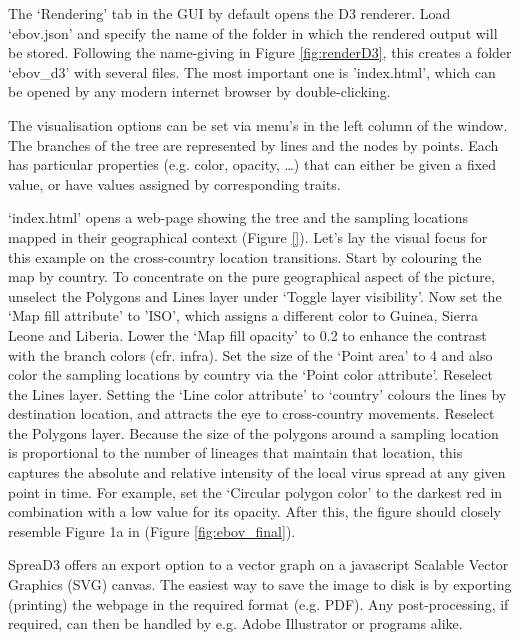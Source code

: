 \documentclass[english]{paper}
\begin{document}
The `Rendering' tab in the GUI by default opens the D3 renderer.
Load `ebov.json' and specify the name of the folder in which the rendered output will be stored. %
Following the name-giving in Figure \ref{fig:renderD3}, this creates a folder `ebov\_d3' with several files.
The most important one is 'index.html', which can be opened by any modern internet browser by double-clicking. 
\par
The visualisation options can be set via menu's in the left column of the window.
The branches of the tree are represented by lines and the nodes by points. %
Each has particular properties (e.g. color, opacity, \dots) that can either be given a fixed value, or have values assigned by corresponding traits.
\par
`index.html' opens a web-page showing the tree and the sampling locations mapped in their geographical context (Figure \ref{}). 
Let's lay the visual focus for this example on the cross-country location transitions.
Start by colouring the map by country. 
To concentrate on the pure geographical aspect of the picture, unselect the Polygons and Lines layer under `Toggle layer visibility'.
Now set the `Map fill attribute' to 'ISO', which assigns a different color to Guinea, Sierra Leone and Liberia.
Lower the `Map fill opacity' to 0.2 to enhance the contrast with the branch colors (cfr. infra).
Set the size of the `Point area' to 4 and also color the sampling locations by country via the `Point color attribute'.
Reselect the Lines layer.
Setting the `Line color attribute' to `country' colours the lines by destination location, and attracts the eye to cross-country movements.
Reselect the Polygons layer.
Because the size of the polygons around a sampling location is proportional to the number of lineages that maintain that location, this captures the absolute and relative intensity of the local virus spread at any given point in time.
For example, set the `Circular polygon color'  to the darkest red in combination with a low value for its opacity. 
After this, the figure should closely resemble Figure 1a in \cite{Bielejec:2016aa} (Figure \ref{fig:ebov_final}).
\par
SpreaD3 offers an export option to a vector graph on a javascript Scalable Vector Graphics (SVG) canvas.
The easiest way to save the image to disk is by exporting (printing) the webpage in the required format (e.g. PDF).
Any post-processing, if required, can then be handled by e.g. Adobe Illustrator or programs alike.
\end{document}
